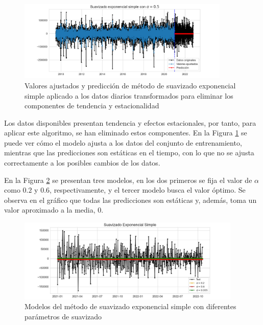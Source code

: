 \documentclass[12pt,twoside]{article}
\begin{document}
\begin{figure}[h]
    \centering
    \includegraphics[width = 0.9\textwidth]{imagenes/SimpleES1.png}
    \caption{Valores ajustados y predicción de método de suavizado exponencial simple aplicado a los datos diarios transformados para eliminar los componentes de tendencia y estacionalidad}\label{fig:SimpleES1}
\end{figure}


Los datos disponibles presentan tendencia y efectos estacionales, por tanto, para aplicar este algoritmo, se han eliminado estos componentes. En  la Figura \ref{fig:SimpleES1} se puede ver cómo el modelo ajusta a los datos del conjunto de entrenamiento, mientras que las predicciones son estáticas en el tiempo, con lo que no se ajusta correctamente a los posibles cambios de los datos.

En la Figura \ref{fig:SimpleES2} se presentan tres modelos, en los dos primeros se fija el valor de $\alpha$ como $0.2$ y $0.6$, respectivamente, y el tercer modelo busca el valor óptimo. Se observa en el gráfico que todas las predicciones son estáticas y, además, toma un valor aproximado a la media, $0$. 
\begin{figure}[h]
    \centering
    \includegraphics[width = 0.95\textwidth]{imagenes/SimpleES2.jpg}
    \caption{Modelos del método de suavizado exponencial simple con diferentes parámetros de suavizado}\label{fig:SimpleES2}
\end{figure}
\end{document}
